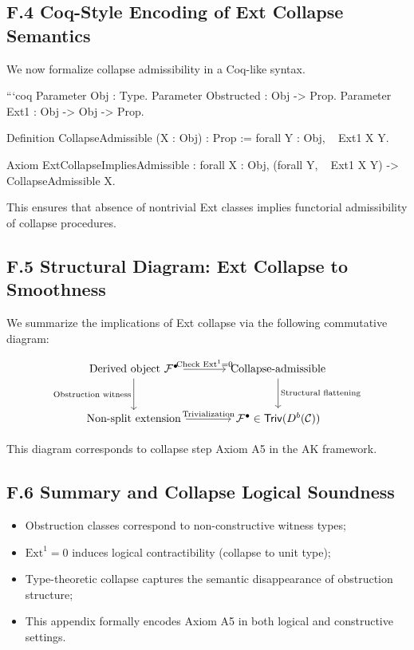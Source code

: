 \documentclass[11pt]{article}
\begin{document}
\subsection*{F.4 Coq-Style Encoding of Ext Collapse Semantics}

We now formalize collapse admissibility in a Coq-like syntax.

```coq
Parameter Obj : Type.
Parameter Obstructed : Obj -> Prop.
Parameter Ext1 : Obj -> Obj -> Prop.

Definition CollapseAdmissible (X : Obj) : Prop :=
  forall Y : Obj,
    ~ Ext1 X Y.

Axiom ExtCollapseImpliesAdmissible :
  forall X : Obj,
    (forall Y, ~ Ext1 X Y) ->
    CollapseAdmissible X.

This ensures that absence of nontrivial Ext classes implies
functorial admissibility of collapse procedures.

\subsection*{F.5 Structural Diagram: Ext Collapse to Smoothness}

We summarize the implications of Ext collapse via the following commutative diagram:

\[
\begin{tikzcd}[row sep=large, column sep=large]
\text{Derived object } \mathcal{F}^\bullet \arrow[r, "\text{Check } \mathrm{Ext}^1 = 0"] \arrow[d, swap, "\text{Obstruction witness}"]
& \text{Collapse-admissible} \arrow[d, "\text{Structural flattening}"] \\
\text{Non-split extension} \arrow[r, "\text{Trivialization}"]
& \mathcal{F}^\bullet \in \mathsf{Triv}(D^b(\mathcal{C}))
\end{tikzcd}
\]

This diagram corresponds to collapse step Axiom A5 in the AK framework.

\subsection*{F.6 Summary and Collapse Logical Soundness}

\begin{itemize}
  \item Obstruction classes correspond to non-constructive witness types;
  \item \( \mathrm{Ext}^1 = 0 \) induces logical contractibility (collapse to unit type);
  \item Type-theoretic collapse captures the semantic disappearance of obstruction structure;
  \item This appendix formally encodes Axiom A5 in both logical and constructive settings.
\end{itemize}
\end{document}
